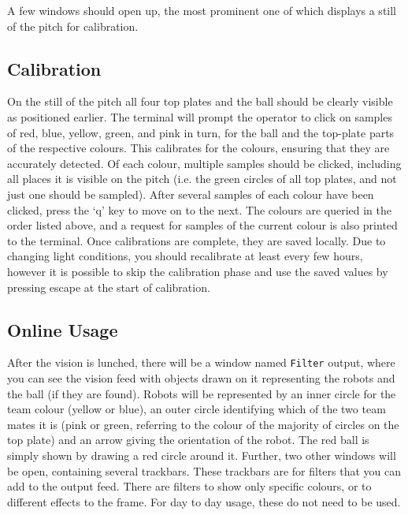 A few windows should open up, the most prominent one of which displays a still
of the pitch for calibration.

\subsection{Calibration}

On the still of the pitch all four top plates and the ball should be clearly
visible as positioned earlier. The terminal will prompt the operator to click
on samples of red, blue, yellow, green, and pink in turn, for the ball and the
top-plate parts of the respective colours. This calibrates for the colours,
ensuring that they are accurately detected. Of each colour, multiple samples
should be clicked, including all places it is visible on the pitch (i.e. the
green circles of all top plates, and not just one should be sampled). After
several samples of each colour have been clicked, press the `q' key to move on
to the next. The colours are queried in the order listed above, and a request
for samples of the current colour is also printed to the terminal. Once
calibrations are complete, they are saved locally. Due to changing light
conditions, you should recalibrate at least every few hours, however it is
possible to skip the calibration phase and use the saved values by pressing
escape at the start of calibration.

\subsection{Online Usage}

After the vision is lunched, there will be a window named \texttt{Filter}
output, where you can see the vision feed with objects drawn on it representing
the robots and the ball (if they are found).  Robots will be represented by an
inner circle for the team colour (yellow or blue), an outer circle identifying
which of the two team mates it is (pink or green, referring to the colour of
the majority of circles on the top plate) and an arrow giving the orientation
of the robot. The red ball is simply shown by drawing a red circle around it.
Further, two other windows will be open, containing several trackbars.  These
trackbars are for filters that you can add to the output feed. There are
filters to show only specific colours, or to different effects to the frame.
For day to day usage, these do not need to be used.


